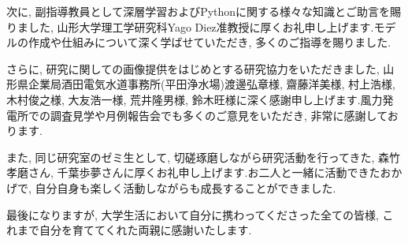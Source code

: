 \documentclass[dvipdfmx]{jsarticle}
\begin{document}
次に, 副指導教員として深層学習およびPythonに関する様々な知識とご助言を賜りました, 山形大学理工学研究科Yago Diez准教授に厚くお礼申し上げます.モデルの作成や仕組みについて深く学ばせていただき, 多くのご指導を賜りました.

さらに, 研究に関しての画像提供をはじめとする研究協力をいただきました, 山形県企業局酒田電気水道事務所(平田浄水場)渡邊弘章様, 齋藤洋美様, 村上浩様, 木村俊之様, 大友浩一様, 荒井隆男様, 鈴木旺様に深く感謝申し上げます.風力発電所での調査見学や月例報告会でも多くのご意見をいただき, 非常に感謝しております.

また, 同じ研究室のゼミ生として, 切磋琢磨しながら研究活動を行ってきた, 森竹孝磨さん, 千葉歩夢さんに厚くお礼申し上げます.お二人と一緒に活動できたおかげで, 自分自身も楽しく活動しながらも成長することができました.

最後になりますが, 大学生活において自分に携わってくださった全ての皆様,  これまで自分を育ててくれた両親に感謝いたします.
\end{document}
